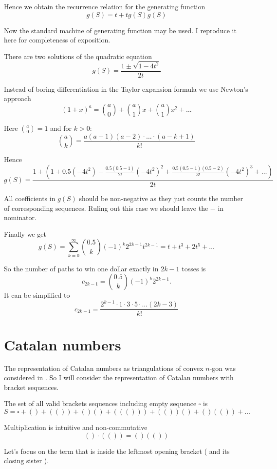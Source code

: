 \documentclass{article}
\begin{document}
Hence we obtain the recurrence relation for the generating function
\[
g(S) = t + t g(S) g(S)	
\]

Now the standard machine of generating function may be used. 
I reproduce it here for completeness of exposition. 

There are two solutions of the quadratic equation
\[
g(S) = \frac{1\pm \sqrt{1 - 4t^2}}{2t}	
\]

Instead of boring differentiation in the Taylor expansion formula we use Newton's approach
\[
(1 + x)^a = \binom{a}{0} + \binom{a}{1} x + \binom{a}{1} x^2 + \ldots 
\]

Here $\binom{a}{0} = 1$ and for $k>0$:
\[
\binom{a}{k} = \frac{a(a-1)(a-2)\cdot \ldots \cdot (a-k + 1)}{k!} 	
\]

Hence 
\[
g(S)  = \frac{1\pm \left(1 + 0.5 (-4t^2) + \frac{0.5(0.5- 1)}{2!}(-4t^2)^2 + \frac{0.5(0.5 - 1)(0.5 - 2)}{3!}(-4t^2)^3 +\ldots    \right)}{2t}	
\]

All coefficients in $g(S)$ should be non-negative as they just counts the number of corresponding sequences.
Ruling out this case we should leave the $-$ in nominator. 

Finally we get
\[
g(S) = \sum_{k=0}^{\infty} \binom{0.5}{k} (-1)^k 2^{2k - 1} t^{2k - 1} = t + t^3 + 2t^5 + \ldots 	
\]


So the number of paths to win one dollar exactly in $2k - 1$ tosses is 
\[
	c_{2k - 1} = \binom{0.5}{k} (-1)^k 2^{2k - 1}.
\]
It can be simplified to
\[
  c_{2k - 1} = \frac{2^{k-1}\cdot 1\cdot 3 \cdot 5 \cdot \ldots (2k - 3)}{k!}	
\]




\section{Catalan numbers}

The representation of Catalan numbers as triangulations of convex $n$-gon 
was considered in \cite{polya1956picture}. 
So I will consider the representation of Catalan numbers with bracket sequences.

The set of all valid brackets sequences including empty sequence $\square$ is 
\[
S = \square + () + (()) + ()() + ((())) + (())() + ()(()) + \ldots
\]

Multiplication is intuitive and non-commutative 
\[
 () \cdot (()) = ()(())
\]

Let's focus on the term that is inside the leftmost opening bracket ( and its closing sister ).
\end{document}
